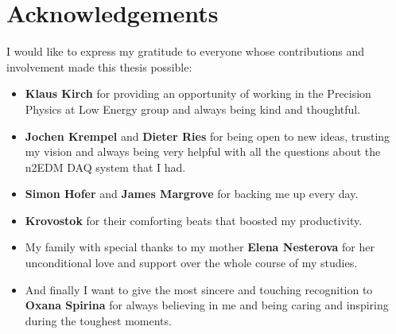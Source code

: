 \chapter{Acknowledgements}

I would like to express my gratitude to everyone whose contributions and involvement made this thesis possible:

\begin{itemize}
	\item \textbf{Klaus Kirch} for providing an opportunity of working in the Precision Physics at Low Energy group and always being kind and thoughtful.
	\item \textbf{Jochen Krempel} and \textbf{Dieter Ries} for being open to new ideas, trusting my vision and always being very helpful with all the questions about the n2EDM DAQ system that I had.
	\item \textbf{Simon Hofer} and \textbf{James Margrove} for backing me up every day.
	\item \textbf{Krovostok} for their comforting beats that boosted my productivity.
	\item My family with special thanks to my mother \textbf{Elena Nesterova} for her unconditional love and support over the whole course of my studies.
	\item And finally I want to give the most sincere and touching recognition to \textbf{Oxana Spirina} for always believing in me and being caring and inspiring during the toughest moments.
\end{itemize}
